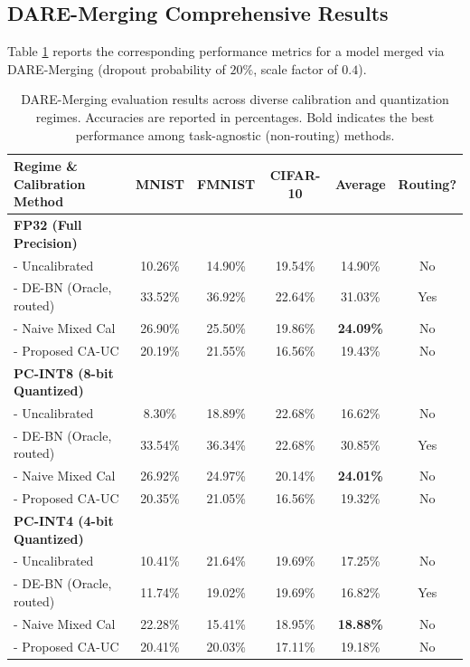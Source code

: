 \documentclass{article}
\theoremstyle{plain}
\theoremstyle{definition}
\theoremstyle{remark}
\begin{document}
\subsection{DARE-Merging Comprehensive Results}
Table \ref{tab:dare_results} reports the corresponding performance metrics for a model merged via DARE-Merging (dropout probability of $20\%$, scale factor of $0.4$).

\begin{table}[H]
\caption{DARE-Merging evaluation results across diverse calibration and quantization regimes. Accuracies are reported in percentages. Bold indicates the best performance among task-agnostic (non-routing) methods.}
\label{tab:dare_results}
\vskip 0.1in
\begin{center}
\begin{small}
\begin{tabular}{lccccc}
\toprule
Regime \& Calibration Method & MNIST & FMNIST & CIFAR-10 & Average & Routing? \\
\midrule
\textbf{FP32 (Full Precision)} & & & & & \\
- Uncalibrated & 10.26\% & 14.90\% & 19.54\% & 14.90\% & No \\
- DE-BN (Oracle, routed) & 33.52\% & 36.92\% & 22.64\% & 31.03\% & Yes \\
- Naive Mixed Cal & 26.90\% & 25.50\% & 19.86\% & \textbf{24.09\%} & No \\
- Proposed CA-UC & 20.19\% & 21.55\% & 16.56\% & 19.43\% & No \\
\midrule
\textbf{PC-INT8 (8-bit Quantized)} & & & & & \\
- Uncalibrated & 8.30\% & 18.89\% & 22.68\% & 16.62\% & No \\
- DE-BN (Oracle, routed) & 33.54\% & 36.34\% & 22.68\% & 30.85\% & Yes \\
- Naive Mixed Cal & 26.92\% & 24.97\% & 20.14\% & \textbf{24.01\%} & No \\
- Proposed CA-UC & 20.35\% & 21.05\% & 16.56\% & 19.32\% & No \\
\midrule
\textbf{PC-INT4 (4-bit Quantized)} & & & & & \\
- Uncalibrated & 10.41\% & 21.64\% & 19.69\% & 17.25\% & No \\
- DE-BN (Oracle, routed) & 11.74\% & 19.02\% & 19.69\% & 16.82\% & Yes \\
- Naive Mixed Cal & 22.28\% & 15.41\% & 18.95\% & \textbf{18.88\%} & No \\
- Proposed CA-UC & 20.41\% & 20.03\% & 17.11\% & 19.18\% & No \\

\end{tabular}
\end{small}
\end{center}
\end{table}
\end{document}
